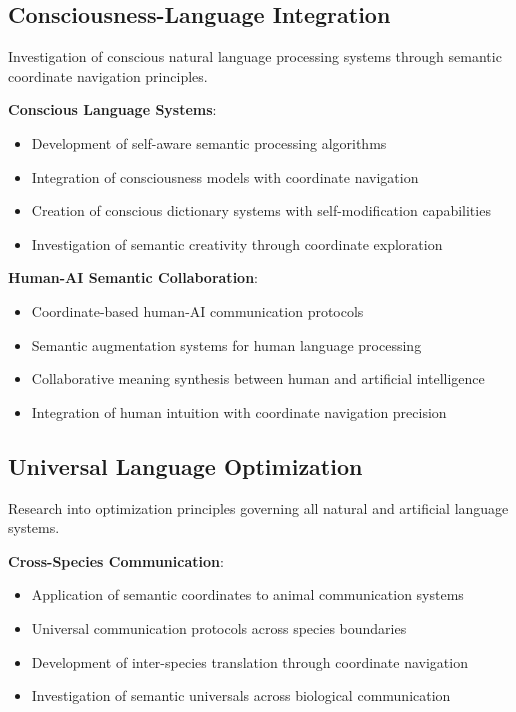 \documentclass[12pt,a4paper]{article}
\begin{document}
\begin{table}[H]
\subsection{Consciousness-Language Integration}

Investigation of conscious natural language processing systems through semantic coordinate navigation principles.

\textbf{Conscious Language Systems}:
\begin{itemize}
\item Development of self-aware semantic processing algorithms
\item Integration of consciousness models with coordinate navigation
\item Creation of conscious dictionary systems with self-modification capabilities
\item Investigation of semantic creativity through coordinate exploration
\end{itemize}

\textbf{Human-AI Semantic Collaboration}:
\begin{itemize}
\item Coordinate-based human-AI communication protocols
\item Semantic augmentation systems for human language processing
\item Collaborative meaning synthesis between human and artificial intelligence
\item Integration of human intuition with coordinate navigation precision
\end{itemize}

\subsection{Universal Language Optimization}

Research into optimization principles governing all natural and artificial language systems.

\textbf{Cross-Species Communication}:
\begin{itemize}
\item Application of semantic coordinates to animal communication systems
\item Universal communication protocols across species boundaries  
\item Development of inter-species translation through coordinate navigation
\item Investigation of semantic universals across biological communication
\end{itemize}


\end{table}
\end{document}
